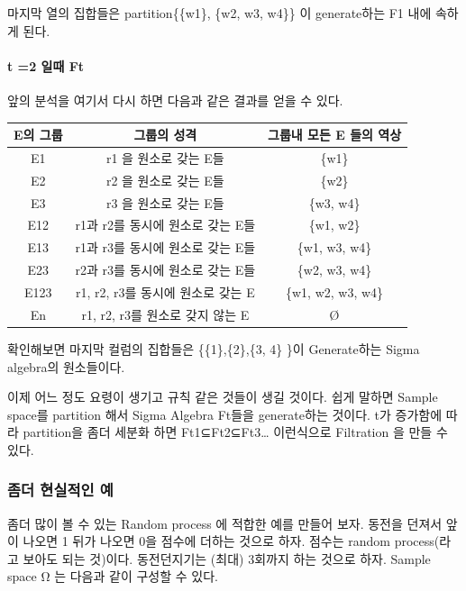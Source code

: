 \documentclass[
]{book}
\begin{document}
{{{마지막 열의 집합들은 partition\{\{w1\}, \{w2, w3, w4\}\} 이 generate하는 F1 내에 속하게 된다.

\hypertarget{t-2-uxc77cuxb54c-ft}{%
\paragraph{t =2 일때 Ft}\label{t-2-uxc77cuxb54c-ft}}

앞의 분석을 여기서 다시 하면 다음과 같은 결과를 얻을 수 있다.

\begin{longtable}[]{@{}ccc@{}}
\toprule
E의 그룹 & 그룹의 성격 & 그룹내 모든 E 들의 역상 \\
\midrule
\endhead
E1 & r1 을 원소로 갖는 E들 & \{w1\} \\
E2 & r2 을 원소로 갖는 E들 & \{w2\} \\
E3 & r3 을 원소로 갖는 E들 & \{w3, w4\} \\
E12 & r1과 r2를 동시에 원소로 갖는 E들 & \{w1, w2\} \\
E13 & r1과 r3를 동시에 원소로 갖는 E들 & \{w1, w3, w4\} \\
E23 & r2과 r3를 동시에 원소로 갖는 E들 & \{w2, w3, w4\} \\
E123 & r1, r2, r3를 동시에 원소로 갖는 E & \{w1, w2, w3, w4\} \\
En & r1, r2, r3를 원소로 갖지 않는 E & Ø \\
\bottomrule
\end{longtable}

확인해보면 마지막 컬럼의 집합들은 \{\{1\},\{2\},\{3, 4\} \}이 Generate하는 Sigma algebra의 원소들이다.

이제 어느 정도 요령이 생기고 규칙 같은 것들이 생길 것이다. 쉽게 말하면 Sample space를 partition 해서 Sigma Algebra Ft들을 generate하는 것이다. t가 증가함에 따라 partition을 좀더 세분화 하면 Ft1⊆Ft2⊆Ft3\ldots{} 이런식으로 Filtration 을 만들 수 있다.

\hypertarget{uxc880uxb354-uxd604uxc2e4uxc801uxc778-uxc608}{%
\subsubsection{좀더 현실적인 예}\label{uxc880uxb354-uxd604uxc2e4uxc801uxc778-uxc608}}

좀더 많이 볼 수 있는 Random process 에 적합한 예를 만들어 보자. 동전을 던져서 앞이 나오면 1 뒤가 나오면 0을 점수에 더하는 것으로 하자. 점수는 random process(라고 보아도 되는 것)이다. 동전던지기는 (최대) 3회까지 하는 것으로 하자. Sample space Ω 는 다음과 같이 구성할 수 있다.

}}}
\end{document}
